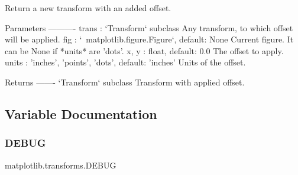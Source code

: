 \begin{DoxyVerb}Return a new transform with an added offset.

Parameters
----------
trans : `Transform` subclass
    Any transform, to which offset will be applied.
fig : `~matplotlib.figure.Figure`, default: None
    Current figure. It can be None if *units* are 'dots'.
x, y : float, default: 0.0
    The offset to apply.
units : {'inches', 'points', 'dots'}, default: 'inches'
    Units of the offset.

Returns
-------
`Transform` subclass
    Transform with applied offset.
\end{DoxyVerb}
 

\subsection{Variable Documentation}
\mbox{\label{namespacematplotlib_1_1transforms_ac94acdc432ebaea39ea805f68cda4261}} 
\subsubsection{\texorpdfstring{D\+E\+B\+UG}{DEBUG}}
{\footnotesize\ttfamily matplotlib.\+transforms.\+D\+E\+B\+UG}

